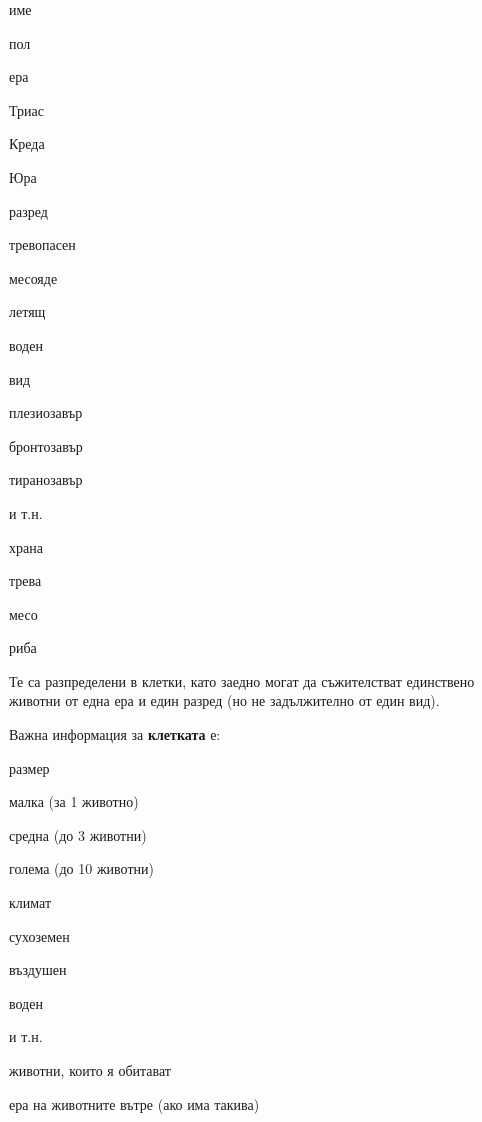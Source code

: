\begin{DoxyItemize}
\item име
\item пол
\item ера
\begin{DoxyItemize}
\item Триас
\item Креда
\item Юра
\end{DoxyItemize}
\item разред
\begin{DoxyItemize}
\item тревопасен
\item месояде
\item летящ
\item воден
\end{DoxyItemize}
\item вид
\begin{DoxyItemize}
\item плезиозавър
\item бронтозавър
\item тиранозавър
\item и т.\+н.
\end{DoxyItemize}
\item храна
\begin{DoxyItemize}
\item трева
\item месо
\item риба
\end{DoxyItemize}
\end{DoxyItemize}

Те са разпределени в клетки, като заедно могат да съжителстват единствено животни от една ера и един разред (но не задължително от един вид).

Важна информация за {\bfseries клетката} е\+:


\begin{DoxyItemize}
\item размер
\begin{DoxyItemize}
\item малка (за 1 животно)
\item средна (до 3 животни)
\item голема (до 10 животни)
\end{DoxyItemize}
\item климат
\begin{DoxyItemize}
\item сухоземен
\item въздушен
\item воден
\item и т.\+н.
\end{DoxyItemize}
\item животни, които я обитават
\item ера на животните вътре (ако има такива)
\end{DoxyItemize}

